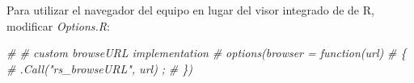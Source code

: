 \documentclass[
]{book}
\newenvironment{Shaded}{\begin{snugshade}}{\end{snugshade}}
\newcommand{\CommentTok}[1]{\textcolor[rgb]{0.56,0.35,0.01}{\textit{#1}}}
\begin{document}
Para utilizar el navegador del equipo en lugar del visor integrado de de R, modificar \emph{Options.R}:

\begin{Shaded}
\begin{Highlighting}[]
\CommentTok{\# \# custom browseURL implementation}
\CommentTok{\# options(browser = function(url)}
\CommentTok{\# \{}
\CommentTok{\#    .Call("rs\_browseURL", url) ;}
\CommentTok{\# \})}
\end{Highlighting}
\end{Shaded}


  
\end{document}
